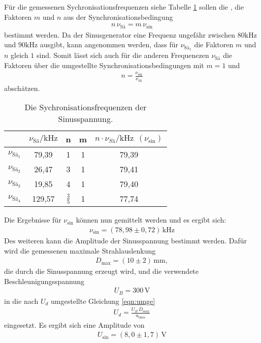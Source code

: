 Für die gemessenen Sychronisationsfrequenzen siehe Tabelle \ref{tab:syn}
sollen die ,
die Faktoren $m$ und $n$
aus der Synchronisationsbedingung
\begin{align*}
  n\,\nu_\mathrm{Sä}=m\,\nu_\mathrm{sin}
\end{align*}
bestimmt werden.
Da der Sinusgenerator eine Frequenz
ungefähr zwischen $80\si{\kilo\hertz}$ und $90\si{\kilo\hertz}$
ausgibt, kann angenommen werden, dass für $\nu_\mathrm{Sä_1}$ die Faktoren $m$ und $n$
gleich $1$ sind. Somit lässt sich auch für die anderen Frequenezen $\nu_\mathrm{Sä}$ die Faktoren über
die umgestellte Synchronisationsbedingungen  mit $m=1$ und
 \begin{align*}
   n=\frac{\nu_{\sin}}{\nu_{Sä}}
 \end{align*}
 abschätzen.
\begin{table}
  \centering
  \caption{Die Sychronisationsfrequenzen der Sinusspannung.}
  \label{tab:syn}
  \begin{tabular}{c c c c c}
\toprule  %
 &  $ \nu_\mathrm{Sä} / \si{\kilo\hertz} $ & n & m & $n\cdot\nu_{Sä}/\si{\kilo\hertz}\ \ (\nu_{\sin})$ \\
\midrule
$\nu_\mathrm{Sä_1}$ & 79,39  & 1 & 1 &  79,39  \\
$\nu_\mathrm{Sä_2}$ & 26,47  & 3 & 1 &  79,41  \\
$\nu_\mathrm{Sä_3}$ & 19,85  & 4 & 1 &  79,40  \\
$\nu_\mathrm{Sä_4}$ & 129,57 & $\frac{3}{5}$ & 1 & 77,74\\
\bottomrule
\end{tabular}
\end{table}
\FloatBarrier
Die Ergebnisse für  $\nu_{\sin}$ können nun gemittelt werden und es ergibt sich:
\begin{align*}
  \nu_{\sin}=(78,98\pm0,72)\,\si{\kilo\hertz}
\end{align*}
Des weiteren kann die Amplitude der Sinusspannung bestimmt werden.
Dafür wird die gemessenen maximale Strahlauslenkung
\begin{align*}
D_\mathrm{max}=(10\pm2)\,\si{\milli\meter},
\end{align*}
die durch die Sinusspannung erzeugt wird,
und die verwendete Beschleunigungsspannung
\begin{align*}
U_B=300\,\si{\volt}
\end{align*}
in die nach $U_d$ umgestellte Gleichung \eqref{eqn:umge}
\begin{align}
U_d=\frac{U_B\,D_{max}}{a_\mathrm{theo}}\label{eqn:umge}
\end{align}
eingesetzt.
Es ergibt sich eine Amplitude von
\begin{align*}
U_\mathrm{\sin}=(8,0\pm1,7)\,\si{\volt}
\end{align*}



